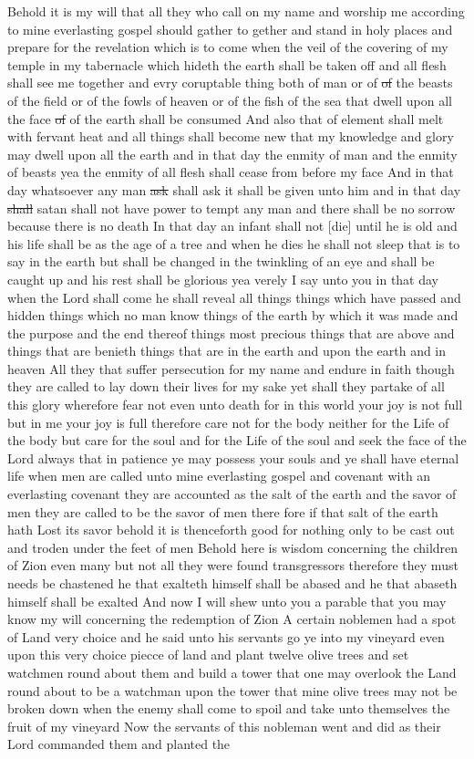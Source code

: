 				Behold it is my will that all they who call on my name and worship me according to mine everlasting gospel should gather to gether and stand in holy places and prepare for the revelation which is to come when the veil of the covering of my temple in my tabernacle which hideth the earth shall be taken off and all flesh shall see me together and evry coruptable thing both of man or of \sout{of} the beasts of the field or of the fowls of heaven or of the fish of the sea that dwell upon all the face \sout{of} of the earth shall be consumed And also that of element shall melt with fervant heat and all things shall become new that my knowledge and glory may dwell upon all the earth and in that day the enmity of man and the enmity of beasts yea the enmity of all flesh shall cease from before my face And in that day whatsoever any man \sout{ask} shall ask it shall be given unto him and in that day \sout{shall} satan shall not have power to tempt any man and there shall be no sorrow because there is no death In that day an infant shall not [die] until he is old and his life shall be as the age of a tree and when he dies he shall not sleep that is to say in the earth but shall be changed in the twinkling of an eye and shall be caught up and his rest shall be glorious yea verely I say unto you in that day when the Lord shall come he shall reveal all things things which have passed and hidden things which no man know things of the earth by which it was made and the purpose and the end thereof things most precious things that are above and things that are benieth things that are in the earth and upon the earth and in heaven All they that suffer persecution for my name and endure in faith though they are called to lay down their lives for my sake yet shall they partake of all this glory wherefore fear not even unto death for in this world your joy is not full but in me your joy is full therefore care not for the body neither for the Life of the body but care for the soul and for the Life of the soul and seek the face of the Lord always that in patience ye may possess your souls and ye shall have eternal life when men are called unto mine everlasting gospel and covenant with an everlasting covenant they are accounted as the salt of the earth and the savor of men they are called to be the savor of men there fore if that salt of the earth hath Lost its savor behold it is thenceforth good for nothing only to be cast out and troden under the feet of men Behold here is wisdom concerning the children of Zion even many but not all they were found transgressors therefore they must needs be chastened he that exalteth himself shall be abased and he that abaseth himself shall be exalted And now I will shew unto you a parable that you may know my will concerning the redemption of Zion A certain noblemen had a spot of Land very choice and he said unto his servants go ye into my vineyard even upon this very choice piecce of land and plant twelve olive trees and set watchmen round about them and build a tower that one may overlook the Land round about to be a watchman upon the tower that mine olive trees may not be broken down when the enemy shall come to spoil and take unto themselves the fruit of my vineyard Now the servants of this nobleman went and did as their Lord commanded them and planted the 